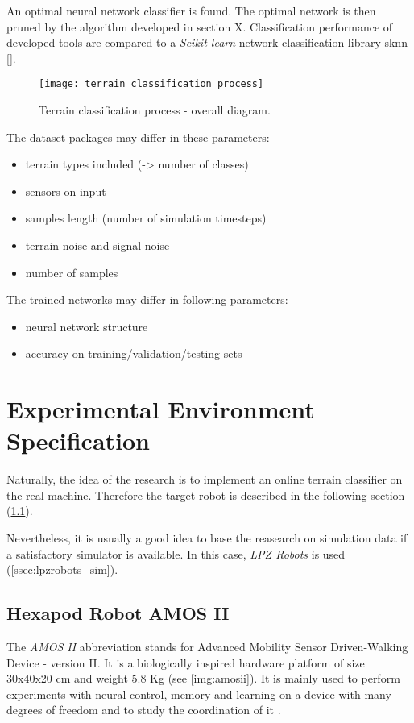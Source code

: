 An optimal neural network classifier is found. The optimal network is then pruned by the algorithm developed in section X. Classification performance of developed tools are compared to a \textit{Scikit-learn} network classification library sknn [].

\begin{figure}[H]
  \centering
  \texttt{[image: terrain\_classification\_process]}
  \caption{Terrain classification process - overall diagram.}
  \label{img:terrain_classification_process}
\end{figure}

The dataset packages may differ in these parameters:
\begin{itemize}
\item terrain types included (-> number of classes)
\item sensors on input
\item samples length (number of simulation timesteps)
\item terrain noise and signal noise
\item number of samples
\end{itemize}

The trained networks may differ in following parameters:
\begin{itemize}
\item neural network structure
\item accuracy on training/validation/testing sets 
\end{itemize}

\section{Experimental Environment Specification}
Naturally, the idea of the research is to implement an online terrain classifier on the real machine. Therefore the target robot is described in the following section (\ref{ssec:amosii}).

Nevertheless, it is usually a good idea to base the reasearch on simulation data if a satisfactory simulator is available. In this case, \textit{LPZ Robots} \citep{misc:lpzrobots} is used (\cref{ssec:lpzrobots_sim}).

\subsection{Hexapod Robot AMOS II} \label{ssec:amosii}
The \textit{AMOS II} abbreviation stands for Advanced Mobility Sensor Driven-Walking Device - version II. It is a biologically inspired hardware platform of size 30x40x20 cm and weight 5.8 Kg (see \cref{img:amosii}). It is mainly used to perform experiments with neural control, memory and learning on a device with many degrees of freedom and to study the coordination of it \citep{misc:amosii}.


